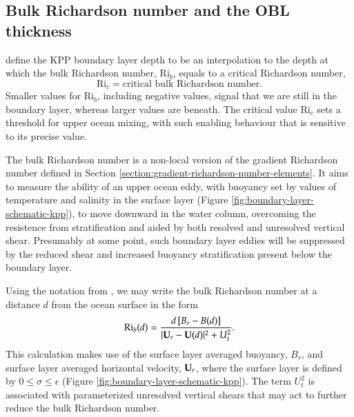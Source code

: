 \subsection{Bulk Richardson number and the OBL thickness}
\label{subsection:kpp-obl-thickness}

\cite{LargeKPP} define the KPP boundary layer depth to be an
interpolation to the depth at which the bulk Richardson number,
$\mbox{Ri}_{b}$, equals to a critical Richardson number,
\begin{equation}
 \mbox{Ri}_{c}  = \mbox{critical bulk Richardson number}. 
\label{eq:critical-bulk-richardson-number}
\end{equation}
Smaller values for $\mbox{Ri}_{b}$, including negative values, signal
that we are still in the boundary layer, whereas larger values are
beneath.  The critical value $\mbox{Ri}_{c}$ sets a threshold for
upper ocean mixing, with such enabling behaviour that is sensitive to
its precise value.

The bulk Richardson number is a non-local version of the gradient
Richardson number defined in Section
\ref{section:gradient-richardson-number-elements}.  It aims to measure
the ability of an upper ocean eddy, with buoyancy set by values of
temperature and salinity in the surface layer (Figure
\ref{fig:boundary-layer-schematic-kpp}), to move downward in the water
column, overcoming the resistence from stratification and aided by
both resolved and unresolved vertical shear.  Presumably at some
point, such boundary layer eddies will be suppressed by the reduced
shear and increased buoyancy stratification present below the boundary
layer.

Using the notation from \cite{LargeKPP}, we may write the bulk
Richardson number at a distance $d$ from the ocean surface in the form
\begin{equation}
  \mbox{Ri}_{b}(d) = \frac{d \, [B_{r} - B(d) ]}{ |{\bf U}_{r} - {\bf U}(d)|^{2} + U_{t}^{2}}. 
\label{eq:bulk-ri-large-kpp-large-etal-form}
\end{equation}
This calculation makes use of the surface layer averaged buoyancy,
$B_{r}$, and surface layer averaged horizontal velocity, ${\bf
  U}_{r}$, where the surface layer is defined by $0 \le \sigma \le
\epsilon$ (Figure \ref{fig:boundary-layer-schematic-kpp}). The term
$U_{t}^{2}$ is associated with parameterized unresolved vertical
shears that may act to further reduce the bulk Richardson number.

